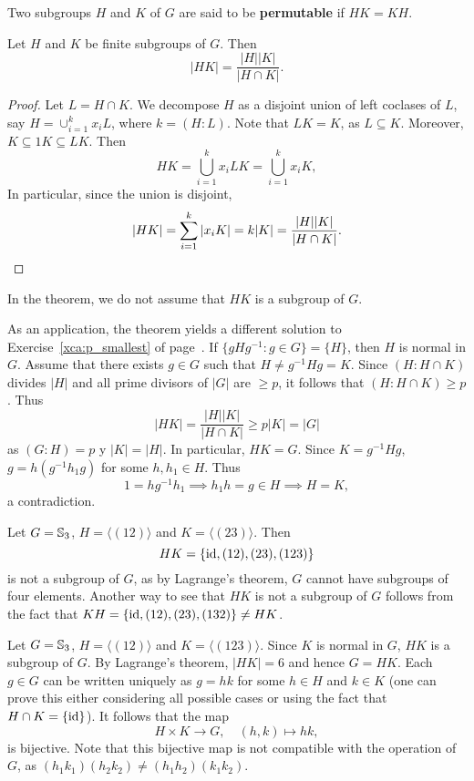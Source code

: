 Two subgroups $H$ and $K$ of $G$ are said to be
\textbf{permutable} if $HK=KH$.

\begin{theorem}
\label{thm:|HK|}
    Let $H$ and $K$ be finite subgroups of $G$. 
    Then 
    \[
        |HK|=\frac{|H||K|}{|H\cap K|}.
    \]
\end{theorem}

\begin{proof}
Let $L=H\cap K$.
We decompose $H$ as a disjoint union of left coclases of $L$, say 
$H=\cup_{i=1}^k x_iL$, where $k=(H:L)$. Note that $LK=K$, as $L\subseteq K$. Moreover, $K\subseteq 1K\subseteq LK$.
Then
\[
HK=\bigcup_{i=1}^k x_iLK=\bigcup_{i=1}^k x_iK,
\]
In particular, since the union is disjoint, 
\[
|HK|=\sum_{i=1}^k |x_iK|=k|K|=\frac{|H||K|}{|H\cap K|}.\qedhere
\]
\end{proof}

In the theorem, we do not assume that $HK$ is a subgroup of $G$. 

As an application, the theorem yields a different solution to Exercise~\ref{xca:p_smallest} of page~\pageref{xca:p_smallest}. 
If $\{gHg^{-1}:g\in G\}=\{H\}$, then $H$ is normal in $G$. Assume that
there exists $g\in G$ such that
$H\ne g^{-1}Hg=K$. Since $(H:H\cap K)$ divides $|H|$ 
and all prime divisors of $|G|$ 
are $\geq p$, it follows that $(H:H\cap K)\geq p$. Thus 
\[
|HK|=\frac{|H||K|}{|H\cap K|}\geq p|K|=|G|
\]
as $(G:H)=p$ y $|K|=|H|$. In particular, $HK=G$. Since $K=g^{-1}Hg$, 
$g=h(g^{-1}h_1g)$ for some $h,h_1\in H$. Thus 
\[
1=hg^{-1}h_1\implies h_1h=g\in H\implies H=K,
\]
a contradiction.

\begin{example}
Let $G=\mathbb{S}_3$, $H=\langle (12)\rangle$ and $K=\langle (23)\rangle$. Then 
\[
HK=\{\operatorname{id},(12),(23),(123)\}
\]
is not a subgroup of $G$, as by Lagrange's theorem, 
$G$ cannot have subgroups of four elements. Another way 
to see that $HK$ is not a subgroup of $G$ follows from 
the fact that 
$KH=\{\operatorname{id},(12),(23),(132)\}\ne HK$.
\end{example}

\begin{example}
Let $G=\mathbb{S}_3$, $H=\langle (12)\rangle$ and $K=\langle (123)\rangle$.
Since $K$ is normal in $G$, $HK$ is a subgroup of $G$. By Lagrange's theorem, $|HK|=6$ and hence $G=HK$.
Each $g\in G$ can be written uniquely as $g=hk$ for some $h\in H$ and $k\in K$ (one can prove this either considering all possible cases or 
using the fact that $H\cap K=\{\operatorname{id}\}$). It follows that the map 
\[
H\times K\to G,\quad
(h,k)\mapsto hk,
\]
is bijective. Note that this bijective map is not compatible 
with the operation of $G$, as 
$(h_1k_1)(h_2k_2)\ne (h_1h_2)(k_1k_2)$. 
\end{example}

